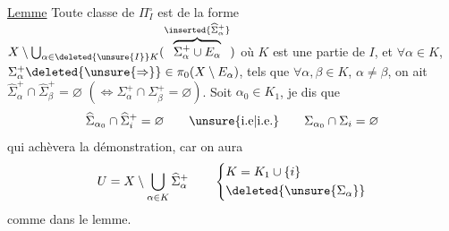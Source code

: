 \uline{Lemme} Toute classe de $\Pi_I^\circ$ est de la forme $X\setminus\bigcup_{\alpha\in\deleted{\unsure{I}}K}(\overbrace{\Sigma_\alpha^+\cup E_\alpha}^{\inserted{\widehat{\Sigma}_\alpha^+}})$ où $K$ est une partie  de $I$, et
\reversemarginpar{}\normalmarginpar
$\forall\alpha\in K$,  $\Sigma_\alpha^+\deleted{\unsure{\Rightarrow}}\in\pi_0(X\setminus E_\alpha)$, tels que $\forall\alpha,\beta\in K$, $\alpha\ne\beta$, on ait $\widehat{\Sigma}_\alpha^+\cap\widehat{\Sigma}_\beta^+=\varnothing$ $(\Longleftrightarrow\Sigma_\alpha^+\cap\Sigma_\beta^+=\varnothing)$.
Soit $\alpha_0\in K_1$, je dis que 
\[
\widehat{\Sigma}_{\alpha_0}\cap\widehat{\Sigma}_i^+=\varnothing
\qquad\text{\unsure{i.e|i.e.}}\qquad
\Sigma_{\alpha_0}\cap\Sigma_i=\varnothing
\]
 qui achèvera la démonstration, car on aura
\[
U=X\setminus\bigcup_{\alpha\in K}\widehat{\Sigma}_\alpha^+
\qquad\left\{\begin{aligned}
&K=K_1\cup\{i\}\\
&\deleted{\unsure{\Sigma_\alpha}}
\end{aligned}\right.
\]
comme dans le lemme.

